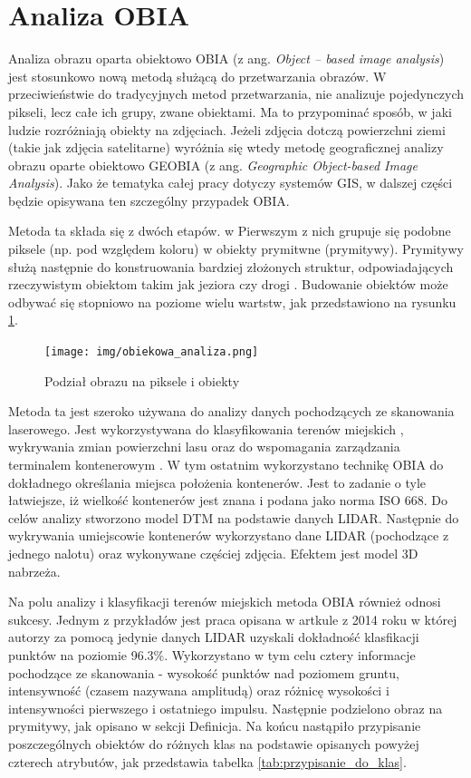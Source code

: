 \section{Analiza OBIA}

Analiza obrazu oparta obiektowo OBIA (z ang. \textit{Object – based image analysis}) jest stosunkowo nową metodą \cite{burnett2003} służącą do przetwarzania obrazów. W przeciwieństwie do tradycyjnych metod przetwarzania, 
nie analizuje pojedynczych pikseli, lecz całe ich grupy, zwane obiektami. Ma to przypominać sposób, w jaki ludzie rozróżniają obiekty na zdjęciach. Jeżeli zdjęcia dotczą powierzchni ziemi (takie jak zdjęcia 
satelitarne) wyróżnia się wtedy metodę geograficznej analizy obrazu oparte obiektowo GEOBIA (z ang. \textit{Geographic Object-based Image Analysis}). Jako że tematyka całej pracy dotyczy systemów GIS,
w dalszej części będzie opisywana ten szczególny przypadek OBIA.

Metoda ta składa się z dwóch etapów. w Pierwszym z nich grupuje się podobne piksele (np. pod względem koloru) w obiekty prymitwne (prymitywy). Prymitywy służą następnie do konstruowania bardziej złożonych 
struktur, odpowiadających rzeczywistym obiektom takim jak jeziora czy drogi \cite{Blaschke2014}.  Budowanie obiektów może odbywać się stopniowo na poziome wielu wartstw, jak przedstawiono na rysunku
\ref{fig:poziomy_struktury}.

\begin{figure}[h!]
    \centering
    \texttt{[image: img/obiekowa\_analiza.png]}
    \caption{Podział obrazu na piksele i obiekty}
    \label{fig:poziomy_struktury}
\end{figure}

Metoda ta jest szeroko używana do analizy danych pochodzących ze skanowania laserowego. Jest wykorzystywana do klasyfikowania terenów miejskich \cite{zhou2013,chen2014},
wykrywania zmian powierzchni lasu \cite{zhang2014} oraz do wspomagania zarządzania terminalem kontenerowym \cite{tiede2015}. W tym ostatnim wykorzystano technikę OBIA do dokładnego określania miejsca położenia
kontenerów. Jest to zadanie o tyle łatwiejsze, iż wielkość kontenerów jest znana i podana jako norma ISO 668. Do celów analizy stworzono model DTM na podstawie danych LIDAR. Następnie do wykrywania
umiejscowie kontenerów wykorzystano dane LIDAR (pochodzące z jednego nalotu) oraz wykonywane częściej zdjęcia. Efektem jest model 3D nabrzeża.

Na polu analizy i klasyfikacji terenów miejskich metoda OBIA również odnosi sukcesy. Jednym z przykładów jest praca opisana w artkule z 2014 roku \cite{chen2014} w której autorzy za pomocą jedynie
danych LIDAR uzyskali dokładność klasfikacji punktów na poziomie  96.3\%. Wykorzystano w tym celu cztery informacje pochodzące ze skanowania - wysokość punktów nad poziomem gruntu, intensywność (czasem
nazywana amplitudą) oraz różnicę wysokości i intensywności pierwszego i ostatniego impulsu. Następnie podzielono obraz na prymitywy, jak opisano w sekcji Definicja. Na końcu nastąpiło przypisanie poszczególnych
obiektów do różnych klas na podstawie opisanych powyżej czterech atrybutów, jak przedstawia tabelka \ref{tab:przypisanie_do_klas}.

